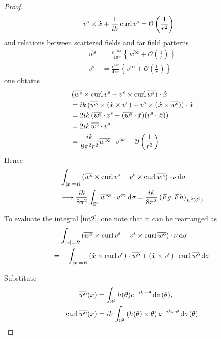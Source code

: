 \begin{proof}
\begin{align}
    v^\text{s}\times\hat{x} + \frac{1}{ik} \operatorname{curl}{v^\text{s}} &= \mathcal{O}\left(\frac{1}{r^2}\right) 
  \end{align}
  and relations between scattered fields and far field patterns
  \begin{align*}
    \overline{w^\text{s}} &= \frac{e^{-ikr}}{4\pi r}\left\{\overline{w^\infty} + \mathcal{O}\left(\frac{1}{r}\right)\right\} \\
    v^\text{s} &= \frac{e^{ikr}}{4\pi r}\left\{v^\infty + \mathcal{O}\left(\frac{1}{r}\right)\right\} 
  \end{align*}
  one obtains
  \begin{align*}
    &\left(\overline{w^\text{s}}\times\operatorname{curl}{v^\text{s}} - v^\text{s}\times\operatorname{curl}{\overline{w^\text{s}}}\right)\cdot\hat{x}\\
    &=ik\left(\overline{w^\text{s}}\times(\hat{x}\times v^\text{s})+v^\text{s}\times(\hat{x}\times\overline{w^\text{s}})\right)\cdot\hat{x} \\
    &=2ik\left(\overline{w^\text{s}}\cdot v^\text{s}-(\overline{w^\text{s}}\cdot\hat{x})(v^\text{s}\cdot\hat{x}\right))\\
    &=2ik\,\overline{w^\text{s}}\cdot v^\text{s}\\
    &=\frac{ik}{8\pi^2 r^2} \overline{w^\infty}\cdot v^\infty + \mathcal{O}\left(\frac{1}{r^3}\right)
  \end{align*}
  Hence
  \begin{align*}
    &\int_{|x|=R}\left(\overline{w^\text{s}}\times\operatorname{curl}{v^\text{s}} - v^\text{s}\times\operatorname{curl}{\overline{w^\text{s}}}\right)\cdot\nu\,\text{d}\sigma\\ 
    &\longrightarrow \frac{ik}{8\pi^2}\int_{\mathbb{S}^2}\overline{w^\infty}\cdot v^\infty\,\text{d}\sigma =\frac{ik}{8\pi^2}\left(Fg, Fh\right)_{L^2(\mathbb{S}^2)}
  \end{align*}

  To evaluate the integral \eqref{int2}, one note that it can be rearranged as
  \begin{align}
    &\int_{|x|=R}\left(\overline{w^\text{o}}\times\operatorname{curl}{v^\text{s}} - v^\text{s}\times\operatorname{curl}{\overline{w^\text{o}}}\right)\cdot\nu\,\text{d}\sigma \\
    =&-\int_{|x|=R}\left(\hat{x}\times\operatorname{curl}{v^\text{s}}\right)\cdot\overline{w^\text{o}}+\left(\hat{x}\times v^\text{s}\right)\cdot\operatorname{curl}{\overline{w^\text{o}}}\,\text{d}\sigma \label{int2a}
  \end{align}

  Substitute  
  \begin{align*}
    \overline{w^\text{o}}(x) &= \int_{\mathbb{S}^2}h(\theta) e^{-i k x\cdot\theta}\, \text{d}\sigma(\theta), \\
    \operatorname{curl}{\overline{w^\text{o}}(x)} &= ik\, \int_{\mathbb{S}^2}\left(h(\theta)\times\theta\right) e^{-i k x\cdot\theta}\, \text{d}\sigma(\theta)
  \end{align*}
  

\end{proof}
